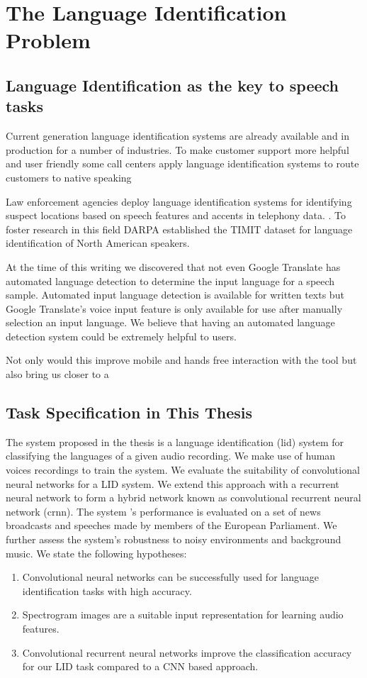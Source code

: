 \section{The Language Identification Problem}
\label{sec:lid}

\subsection{Language Identification as the key to speech tasks}

Current generation language identification systems are already available and in production for a number of industries. To make customer support more helpful and user friendly some call centers apply language identification systems to route customers to native speaking

Law enforcement agencies deploy language identification systems for identifying suspect locations based on speech features and accents in telephony data. . To foster research in this field DARPA established the TIMIT dataset for language identification of North American speakers. 

At the time of this writing we discovered that not even Google Translate has automated language detection to determine the input language for a speech sample. Automated input language detection is available for written texts but Google Translate's voice input feature is only available for use after manually selection an input language. We believe that having an automated language detection system could be extremely helpful to users. 

Not only would this improve mobile and hands free interaction with the tool but also bring us closer to a



\subsection{Task Specification in This Thesis}
The system proposed in the thesis is a language identification (\ac{lid}) system for classifying the languages of a given audio recording. We make use of human voices recordings to train the  system. We evaluate the suitability of convolutional neural networks for a LID system. We extend this approach with a recurrent neural network to form a hybrid network known as convolutional recurrent neural network (\ac{crnn}). The system 's performance is evaluated on a set of news broadcasts and speeches made by members of the European Parliament. We further assess the system's robustness to noisy environments and background music. We state the following hypotheses:

\begin{enumerate}
	\item Convolutional neural networks can be successfully used for language identification tasks with high accuracy.
	\item Spectrogram images are a suitable input representation for learning audio features.
	\item Convolutional recurrent neural networks improve the classification accuracy for our LID task compared to a CNN based approach.
\end{enumerate}


